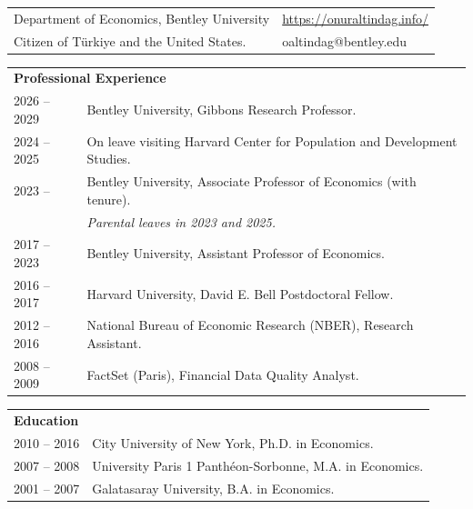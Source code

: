 \documentclass[12pt]{article}
\begin{document}
\thispagestyle{firstpage}

\begin{tabular}{p{\dimexpr\textwidth-6cm\relax}>{\raggedleft\arraybackslash}p{6cm}}
Department of Economics, Bentley University &  \href{https://onuraltindag.info/}{https://onuraltindag.info/} \\
Citizen of T\"{u}rkiye and the United States. & oaltindag@bentley.edu  \\
\end{tabular}

\begin{tabular}{p{3cm}p{\dimexpr\textwidth-3cm\relax}}
\multicolumn{2}{l}{\textbf{Professional Experience}} \\[5pt]
2026 -- 2029 & Bentley University, Gibbons Research Professor. \\
2024 -- 2025 & On leave visiting Harvard Center for Population and Development Studies. \\
2023 --  &  Bentley University, Associate Professor of Economics (with tenure).  \\
& \textit{Parental leaves in 2023 and 2025.} \\
2017 -- 2023  & Bentley University, Assistant Professor of Economics.  \\
2016 -- 2017 &  Harvard University, David E. Bell Postdoctoral Fellow. \\ 
2012 -- 2016 & National Bureau of Economic Research (NBER), Research Assistant. \\ 
2008 -- 2009 & FactSet (Paris), Financial Data Quality Analyst. \\ 
\end{tabular}

\begin{tabular}{p{3cm}p{\dimexpr\textwidth-3cm\relax}}
\textbf{Education} \\[5pt]
2010 -- 2016 &  City University of New York, Ph.D. in Economics.  \\ 
2007 -- 2008 & University Paris 1 Panth\'{e}on-Sorbonne, M.A. in Economics.  \\
2001 -- 2007 & Galatasaray University, B.A. in Economics. \\ 
\end{tabular}
\end{document}

